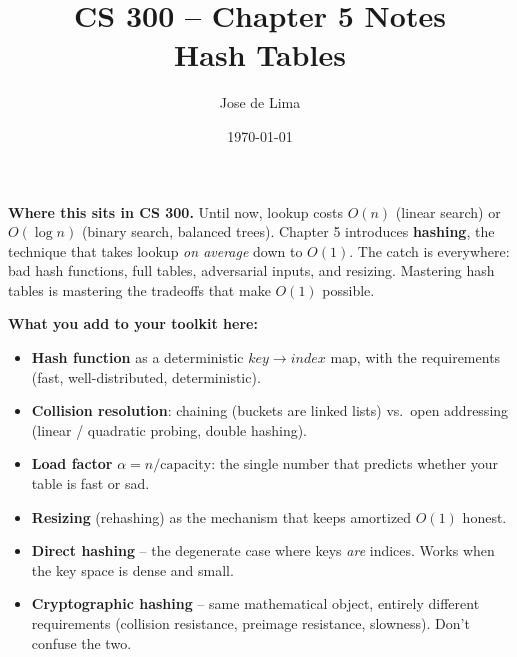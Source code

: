 \documentclass[11pt]{article}
\title{CS 300 -- Chapter 5 Notes\\\large Hash Tables}
\author{Jose de Lima}
\date{\today}
\begin{document}
\maketitle

\begin{ideabox}
\textbf{Where this sits in CS 300.} Until now, lookup costs $O(n)$
(linear search) or $O(\log n)$ (binary search, balanced trees). Chapter 5
introduces \textbf{hashing}, the technique that takes lookup \emph{on
average} down to $O(1)$. The catch is everywhere: bad hash functions,
full tables, adversarial inputs, and resizing. Mastering hash tables is
mastering the tradeoffs that make $O(1)$ possible.

\textbf{What you add to your toolkit here:}
\begin{itemize}
    \item \textbf{Hash function} as a deterministic $key \to index$ map,
          with the requirements (fast, well-distributed, deterministic).
    \item \textbf{Collision resolution}: chaining (buckets are linked
          lists) vs.\ open addressing (linear / quadratic probing,
          double hashing).
    \item \textbf{Load factor} $\alpha = n / \text{capacity}$: the single
          number that predicts whether your table is fast or sad.
    \item \textbf{Resizing} (rehashing) as the mechanism that keeps
          amortized $O(1)$ honest.
    \item \textbf{Direct hashing} -- the degenerate case where keys
          \emph{are} indices. Works when the key space is dense and
          small.
    \item \textbf{Cryptographic hashing} -- same mathematical object,
          entirely different requirements (collision resistance,
          preimage resistance, slowness). Don't confuse the two.
\end{itemize}


\end{ideabox}
\end{document}
